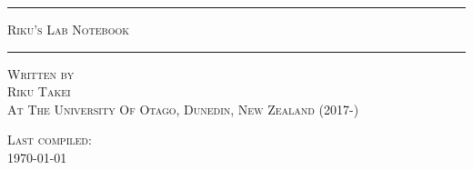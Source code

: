 \begin{titlepage}

\centering

\rule[2.0mm]{\textwidth}{0.5mm}

\vspace{2.0mm}

\begin{doublespace}
    {\Huge \scshape Riku's Lab Notebook}
\end{doublespace}

\vspace{2.0mm}

\rule[2.0mm]{\textwidth}{0.5mm}

\vfill

{\normalsize \scshape Written by\\}
{\Large \scshape Riku Takei\\}
\vspace{2.0mm}
{\normalsize \scshape At The University Of Otago, Dunedin, New Zealand (2017-\the\year)\\}

\vspace{20.0mm}
{\normalsize \scshape Last compiled:\\\today}

\end{titlepage}
